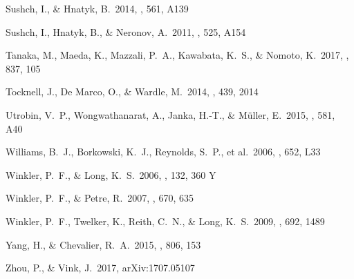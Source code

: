 \documentclass[12pt,preprint,a4paper]{aastex}
\begin{document}
\begin{thebibliography}
 Sushch, I., \& Hnatyk, B.\ 2014, \aap, 561, A139 

 Sushch, I., Hnatyk, B., \& Neronov, A.\ 2011, \aap, 525, A154

 Tanaka, M., Maeda, K., Mazzali, P.~A., Kawabata, K.~S., \& Nomoto, K.\ 2017, \apj, 837, 105

 Tocknell, J., De Marco, O., \& Wardle, M.\ 2014, \mnras, 439, 2014

 Utrobin, V.~P., Wongwathanarat, A., Janka, H.-T., \& M{\"u}ller, E.\ 2015, \aap, 581, A40 

 Williams, B.~J., Borkowski, K.~J., Reynolds, S.~P., et al.\ 2006, \apjl, 652, L33 

 Winkler, P.~F., \& Long, K.~S.\ 2006, \aj, 132, 360 Y

 Winkler, P.~F., \& Petre, R.\ 2007, \apj, 670, 635 

 Winkler, P.~F., Twelker, K., Reith, C.~N., \& Long, K.~S.\ 2009, \apj, 692, 1489 


 Yang, H., \& Chevalier, R.~A.\ 2015, \apj, 806, 153

  Zhou, P., \& Vink, J.\ 2017, arXiv:1707.05107 


\end{thebibliography}
\end{document}
